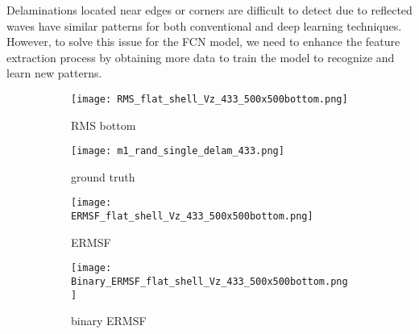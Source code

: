 	Delaminations located near edges or corners are difficult to detect due to reflected waves have similar patterns for both conventional and deep learning techniques. 
	However, to solve this issue for the FCN model, we need to enhance the feature extraction process by obtaining more data to train the model to recognize and learn new patterns.	
	\begin{figure} [h!]
		\centering
		\begin{subfigure}[b]{0.47\textwidth}
			\centering
			\texttt{[image: RMS\_flat\_shell\_Vz\_433\_500x500bottom.png]}
			\caption{RMS bottom}
			\label{fig:dispersion0deg_direct}
		\end{subfigure}
		\hfill
		\begin{subfigure}[b]{0.47\textwidth}
			\centering
			\texttt{[image: m1\_rand\_single\_delam\_433.png]}
			\caption{ground truth}
			\label{fig:m1_rand_single_delam_433}
		\end{subfigure}
		\hfill
		\begin{subfigure}[b]{0.47\textwidth}
			\centering
			\texttt{[image: ERMSF\_flat\_shell\_Vz\_433\_500x500bottom.png]}
			\caption{ERMSF}
			\label{fig:ERMSF_flat_shell_Vz_433}
		\end{subfigure}
		\hfill
		\begin{subfigure}[b]{0.47\textwidth}
			\centering
			\texttt{[image: Binary\_ERMSF\_flat\_shell\_Vz\_433\_500x500bottom.png]}
			\caption{binary ERMSF}
			\label{fig:dispersion45deg_direct}
		\end{subfigure}
		
		
		\caption{}
		\label{fig:RMS433}
	\end{figure} 
	
